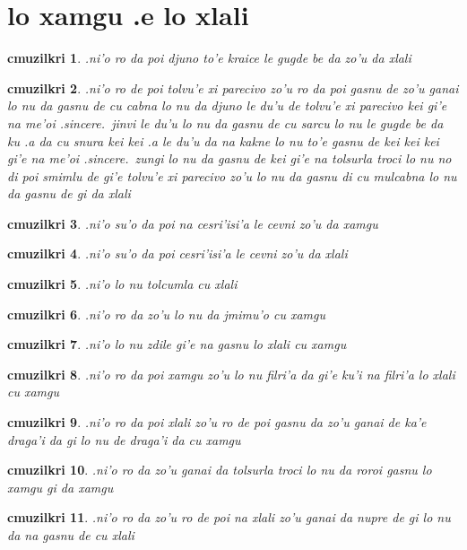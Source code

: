 \documentclass{report}
\newtheorem{cmuzilkri}{cmuzilkri}
\begin{document}
\section{lo xamgu .e lo xlali}
\begin{cmuzilkri}
	.ni'o ro da poi djuno to'e kraice le gugde be da zo'u da xlali
\end{cmuzilkri}
\begin{cmuzilkri}
	.ni'o ro de poi tolvu'e xi parecivo zo'u ro da poi gasnu de zo'u ganai lo nu da gasnu de cu cabna lo nu da djuno le du'u de tolvu'e xi parecivo kei gi'e na me'oi .sincere.\ jinvi le du'u lo nu da gasnu de cu sarcu lo nu le gugde be da ku .a da cu snura kei kei .a le du'u da na kakne lo nu to'e gasnu de kei kei kei gi'e na me'oi .sincere.\ zungi lo nu da gasnu de kei gi'e na tolsurla troci lo nu no di poi smimlu de gi'e tolvu'e xi parecivo zo'u lo nu da gasnu di cu mulcabna lo nu da gasnu de gi da xlali
\end{cmuzilkri}
\begin{cmuzilkri}
	.ni'o su'o da poi na cesri'isi'a le cevni zo'u da xamgu
\end{cmuzilkri}
\begin{cmuzilkri}
	.ni'o su'o da poi cesri'isi'a le cevni zo'u da xlali
\end{cmuzilkri}
\begin{cmuzilkri}
	.ni'o lo nu tolcumla cu xlali
\end{cmuzilkri}
\begin{cmuzilkri}
	.ni'o ro da zo'u lo nu da jmimu'o cu xamgu
\end{cmuzilkri}
\begin{cmuzilkri}
	.ni'o lo nu zdile gi'e na gasnu lo xlali cu xamgu
\end{cmuzilkri}
\begin{cmuzilkri}
	.ni'o ro da poi xamgu zo'u lo nu filri'a da gi'e ku'i na filri'a lo xlali cu xamgu
\end{cmuzilkri}
\begin{cmuzilkri}
	.ni'o ro da poi xlali zo'u ro de poi gasnu da zo'u ganai de ka'e draga'i da gi lo nu de draga'i da cu xamgu
\end{cmuzilkri}
\begin{cmuzilkri}
	.ni'o ro da zo'u ganai da tolsurla troci lo nu da roroi gasnu lo xamgu gi da xamgu
\end{cmuzilkri}
\begin{cmuzilkri}
	.ni'o ro da zo'u ro de poi na xlali zo'u ganai da nupre de gi lo nu da na gasnu de cu xlali
\end{cmuzilkri}
\end{document}

